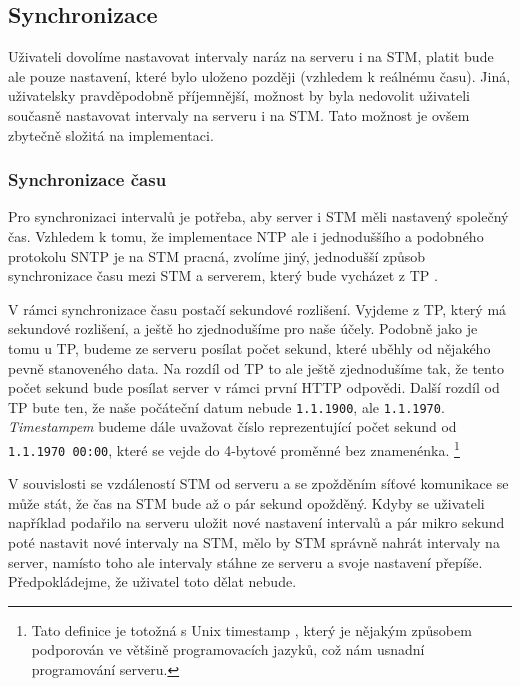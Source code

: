 
\subsection{Synchronizace}

Uživateli dovolíme nastavovat intervaly naráz na serveru i na STM, platit bude ale pouze
nastavení, které bylo uloženo později (vzhledem k reálnému času).
Jiná, uživatelsky pravděpodobně příjemnější, možnost by byla nedovolit uživateli současně
nastavovat intervaly na serveru i na STM.
Tato možnost je ovšem zbytečně složitá na implementaci.

\subsubsection{Synchronizace času}

Pro synchronizaci intervalů je potřeba, aby server i STM měli nastavený společný čas.
Vzhledem k tomu, že implementace NTP \cite{NTP} ale i jednoduššího a podobného
protokolu SNTP \cite{SNTP} je na STM pracná, zvolíme jiný, jednodušší způsob synchronizace
času mezi STM a serverem, který bude vycházet z TP \cite{TP}.

V rámci synchronizace času postačí sekundové rozlišení.
Vyjdeme z TP, který má sekundové rozlišení, a ještě ho zjednodušíme pro naše účely.
Podobně jako je tomu u TP, budeme ze serveru posílat počet sekund, které
uběhly od nějakého pevně stanoveného data.
Na rozdíl od TP to ale ještě zjednodušíme tak, že tento počet sekund bude posílat server
v rámci první HTTP odpovědi.
Další rozdíl od TP bute ten, že naše počáteční datum nebude \texttt{1.1.1900}, ale \texttt{1.1.1970}.
\emph{Timestampem} budeme dále uvažovat číslo reprezentující počet sekund od \texttt{1.1.1970 00:00},
které se vejde do 4-bytové proměnné bez znamenénka.
\footnote{Tato definice je totožná s Unix timestamp \cite{Unix-timestamp}, který je nějakým způsobem
podporován ve většině programovacích jazyků, což nám usnadní programování serveru.}


V souvislosti se vzdáleností STM od serveru a se zpožděním síťové komunikace se může
stát, že čas na STM bude až o pár sekund opožděný.
Kdyby se uživateli například podařilo na serveru uložit nové nastavení intervalů
a pár mikro sekund poté nastavit nové intervaly na STM, mělo by STM správně nahrát
intervaly na server, namísto toho ale intervaly stáhne ze serveru a svoje nastavení přepíše.
Předpokládejme, že uživatel toto dělat nebude.

